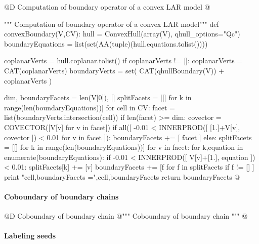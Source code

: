 \documentclass[11pt,oneside]{article}	%
\begin{document}
@D Computation of boundary operator of a convex LAR model
@{""" Computation of boundary operator of a convex LAR model"""
def convexBoundary(V,CV): 
	hull = ConvexHull(array(V), qhull_options="Qc")
	boundaryEquations = list(set(AA(tuple)(hull.equations.tolist())))
	
	coplanarVerts = hull.coplanar.tolist()
	if coplanarVerts != []:  coplanarVerts = CAT(coplanarVerts)
	boundaryVerts = set( CAT(qhullBoundary(V)) + coplanarVerts )
	
	dim, boundaryFacets = len(V[0]), []
	splitFacets = [[] for k in range(len(boundaryEquations))]
	for cell in CV:
		facet = list(boundaryVerts.intersection(cell))
		if len(facet) >= dim:
			covector = COVECTOR([V[v] for v in facet])
			if all([ -0.01 < INNERPROD([ [1.]+V[v], covector ]) < 0.01 for v in facet ]):
				boundaryFacets += [ facet ]
			else:
				splitFacets = [[] for k in range(len(boundaryEquations))]
				for v in facet:
					for k,equation in enumerate(boundaryEquations):
						if -0.01 < INNERPROD([ V[v]+[1.], equation ]) < 0.01:
							splitFacets[k] += [v]
			boundaryFacets += [f for f in splitFacets if f != [] ]
			print "cell,boundaryFacets =",cell,boundaryFacets
	return boundaryFacets
@}


\paragraph{Coboundary of boundary chains}

@D Coboundary of boundary chain
@{""" Coboundary of boundary chain """
@}


\paragraph{Labeling seeds}
\end{document}
